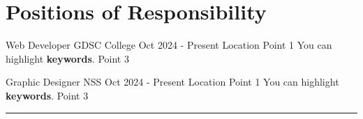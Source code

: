 \section{Positions of Responsibility}
\vspace{-0.4mm}

\resumeSubHeadingListStart
\resumeExp
{Web Developer}
{GDSC College}
{Oct 2024 - Present}
{Location}
\resumeItemListStart
\point Point 1
\point You can highlight \textbf{keywords}.
\point Point 3
\resumeItemListEnd

\resumeExp
{Graphic Designer}
{NSS}
{Oct 2024 - Present}
{Location}
\resumeItemListStart
\point Point 1
\point You can highlight \textbf{keywords}.
\point Point 3
\resumeItemListEnd

\resumeSubHeadingListEnd
\hspace*{-2mm}\rule{1.030\textwidth}{0.1mm}
\vspace{0mm}